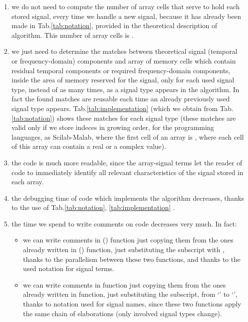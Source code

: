 \documentclass[a4paper,10pt]{article}
\begin{document}
\begin{enumerate}

\item
we do not need to compute the number of array cells that serve to hold each stored signal, every time we handle a new signal, because it has already been made in  Tab.\ref{tab:notation}, provided in the theoretical description of algorithm.
This number of array cells is .


\item
we just need to determine the matches between theoretical signal (temporal or frequency-domain) components and array of memory cells which contain residual temporal components or required frequency-domain components, inside the area of memory reserved for the signal, only for each used signal type, instead of as many times, as a signal type appears in the algorithm.
In fact the found matches are reusable each time an already previously used signal type appears.
Tab.\ref{tab:implementation} (which we obtain from Tab.\ref{tab:notation}) shows these matches for each signal type (these matches are valid only if we store indeces in growing order, for the programming languages, as Scilab-Malab, where the first cell of an array is , where each cell of this array can contain a real or a complex value).

\item
the code is much more readable, since the array-signal terms let the reader of code to immediately identify all relevant characteristics of the signal stored in each array.

\item
the debugging time of code which implements the algorithm decreases, thanks to the use of Tab.\ref{tab:notation}, \ref{tab:implementation} .

\item
the time we spend to write comments on code decreases very much.
In fact:
\begin{itemize}


\item 
we can write comments in  () function just copying them from the ones already written in  () function, just substituting the  subscript with , thanks to the parallelism between these two functions, and thanks to the used notation for signal terms.

\item
we can write comments in  function just copying them from the ones already written in  function, just substituting the  subscript, from `' to `', thanks to notation used for signal names, since these two functions apply the same chain of elaborations (only involved signal types change).



\end{itemize}


\end{enumerate}
\end{document}
